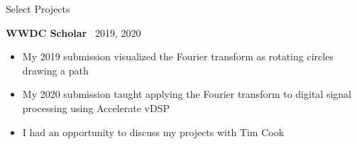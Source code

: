 \documentclass{resume}
\newif\ifisDigital
\begin{document}
\begin{rSection}{Select Projects}


\item \textbf{WWDC Scholar} \ {2019, 2020}
\ifisDigital
\hfill
\href{https://liamrosenfeld.com/projects/fourier-artist/}{2019 Writeup,}
\href{https://liamrosenfeld.com/projects/stfourier-explainer/}{2020 Writeup}
\fi
\begin{itemize}
    \itemsep -3pt {} 
    \vspace{-0.35em}
    \item My 2019 submission visualized the Fourier transform as rotating circles drawing a path
    \item My 2020 submission taught applying the Fourier transform to digital signal processing using Accelerate vDSP
    \item I had an opportunity to discuss my projects with Tim Cook
\end{itemize}
 
\end{rSection} 
\end{document}
